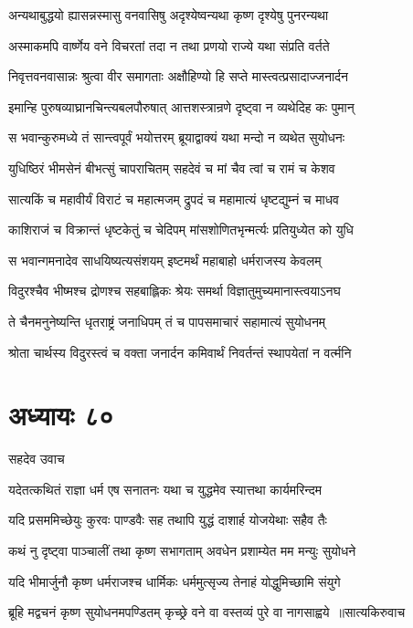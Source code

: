 \twolineshloka
{अन्यथाबुद्धयो ह्यासन्नस्मासु वनवासिषु}
{अदृश्येष्वन्यथा कृष्ण दृश्येषु पुनरन्यथा}


\twolineshloka
{अस्माकमपि वार्ष्णेय वने विचरतां तदा}
{न तथा प्रणयो राज्ये यथा संप्रति वर्तते}


\twolineshloka
{निवृत्तवनवासान्नः श्रुत्वा वीर समागताः}
{अक्षौहिण्यो हि सप्ते मास्त्वत्प्रसादाज्जनार्दन}


\twolineshloka
{इमान्हि पुरुषव्याघ्रानचिन्त्यबलपौरुषात्}
{आत्तशस्त्रान्रणे दृष्ट्वा न व्यथेदिह कः पुमान्}


\twolineshloka
{स भवान्कुरुमध्ये तं सान्त्वपूर्वं भयोत्तरम्}
{ब्रूयाद्वाक्यं यथा मन्दो न व्यथेत सुयोधनः}


\twolineshloka
{युधिष्ठिरं भीमसेनं बीभत्सुं चापराचितम्}
{सहदेवं च मां चैव त्वां च रामं च केशव}


\twolineshloka
{सात्यकिं च महावीर्यं विराटं च महात्मजम्}
{द्रुपदं च महामात्यं धृष्टद्युम्नं च माधव}


\twolineshloka
{काशिराजं च विक्रान्तं धृष्टकेतुं च चेदिपम्}
{मांसशोणितभृन्मर्त्यः प्रतियुध्येत को युधि}


\twolineshloka
{स भवान्गमनादेव साधयिष्यत्यसंशयम्}
{इष्टमर्थं महाबाहो धर्मराजस्य केवलम्}


\twolineshloka
{विदुरश्चैव भीष्मश्च द्रोणश्च सहबाह्लिकः}
{श्रेयः समर्था विज्ञातुमुच्यमानास्त्वयाऽनघ}


\twolineshloka
{ते चैनमनुनेष्यन्ति धृतराष्ट्रं जनाधिपम्}
{तं च पापसमाचारं सहामात्यं सुयोधनम्}


\twolineshloka
{श्रोता चार्थस्य विदुरस्त्वं च वक्ता जनार्दन}
{कमिवार्थं निवर्तन्तं स्थापयेतां न वर्त्मनि}


\chapter{अध्यायः ८०}
\twolineshloka
{सहदेव उवाच}
{}


\twolineshloka
{यदेतत्कथितं राज्ञा धर्म एष सनातनः}
{यथा च युद्धमेव स्यात्तथा कार्यमरिन्दम}


\twolineshloka
{यदि प्रसममिच्छेयुः कुरवः पाण्डवैः सह}
{तथापि युद्धं दाशार्ह योजयेथाः सहैव तैः}


\twolineshloka
{कथं नु दृष्ट्वा पाञ्चालीं तथा कृष्ण सभागताम्}
{अवधेन प्रशाम्येत मम मन्युः सुयोधने}


\twolineshloka
{यदि भीमार्जुनौ कृष्ण धर्मराजश्च धार्मिकः}
{धर्ममुत्सृज्य तेनाहं योद्धुमिच्छामि संयुगे}


\threelineshloka
{ब्रूहि मद्वचनं कृष्ण सुयोधनमपण्डितम्}
{कृच्छ्रे वने वा वस्तव्यं पुरे वा नागसाह्वये ॥सात्यकिरुवाच}
{}


